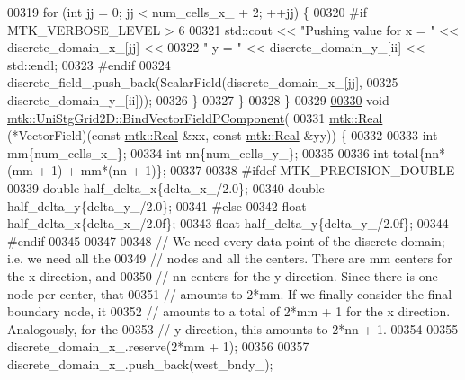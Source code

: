 \begin{DoxyCode}
00319     \textcolor{keywordflow}{for} (\textcolor{keywordtype}{int} jj = 0; jj < num\_cells\_x\_ + 2; ++jj) \{
00320 \textcolor{preprocessor}{      #if MTK\_VERBOSE\_LEVEL > 6}
00321       std::cout << \textcolor{stringliteral}{"Pushing value for x = "} << discrete\_domain\_x\_[jj] <<
00322         \textcolor{stringliteral}{" y = "} << discrete\_domain\_y\_[ii] << std::endl;
00323 \textcolor{preprocessor}{      #endif}
00324       discrete\_field\_.push\_back(ScalarField(discrete\_domain\_x\_[jj],
00325                                             discrete\_domain\_y\_[ii]));
00326     \}
00327   \}
00328 \}
00329 
\hypertarget{mtk__uni__stg__grid__2d_8cc_source_l00330}{}\hyperlink{classmtk_1_1UniStgGrid2D_a47b92d03ef5ed2b1ed28091a424f8f52}{00330} \textcolor{keywordtype}{void} \hyperlink{classmtk_1_1UniStgGrid2D_a47b92d03ef5ed2b1ed28091a424f8f52}{mtk::UniStgGrid2D::BindVectorFieldPComponent}(
00331   \hyperlink{group__c01-roots_gac080bbbf5cbb5502c9f00405f894857d}{mtk::Real} (*VectorField)(\textcolor{keyword}{const} \hyperlink{group__c01-roots_gac080bbbf5cbb5502c9f00405f894857d}{mtk::Real} &xx, \textcolor{keyword}{const} 
      \hyperlink{group__c01-roots_gac080bbbf5cbb5502c9f00405f894857d}{mtk::Real} &yy)) \{
00332 
00333   \textcolor{keywordtype}{int} mm\{num\_cells\_x\_\};
00334   \textcolor{keywordtype}{int} nn\{num\_cells\_y\_\};
00335 
00336   \textcolor{keywordtype}{int} total\{nn*(mm + 1) + mm*(nn + 1)\};
00337 
00338 \textcolor{preprocessor}{  #ifdef MTK\_PRECISION\_DOUBLE}
00339   \textcolor{keywordtype}{double} half\_delta\_x\{delta\_x\_/2.0\};
00340   \textcolor{keywordtype}{double} half\_delta\_y\{delta\_y\_/2.0\};
00341 \textcolor{preprocessor}{  #else}
00342   \textcolor{keywordtype}{float} half\_delta\_x\{delta\_x\_/2.0f\};
00343   \textcolor{keywordtype}{float} half\_delta\_y\{delta\_y\_/2.0f\};
00344 \textcolor{preprocessor}{  #endif}
00345 
00347 
00348   \textcolor{comment}{// We need every data point of the discrete domain; i.e. we need all the}
00349   \textcolor{comment}{// nodes and all the centers. There are mm centers for the x direction, and}
00350   \textcolor{comment}{// nn centers for the y direction. Since there is one node per center, that}
00351   \textcolor{comment}{// amounts to 2*mm. If we finally consider the final boundary node, it}
00352   \textcolor{comment}{// amounts to a total of 2*mm + 1 for the x direction. Analogously, for the}
00353   \textcolor{comment}{// y direction, this amounts to 2*nn + 1.}
00354 
00355   discrete\_domain\_x\_.reserve(2*mm + 1);
00356 
00357   discrete\_domain\_x\_.push\_back(west\_bndy\_);

\end{DoxyCode}

